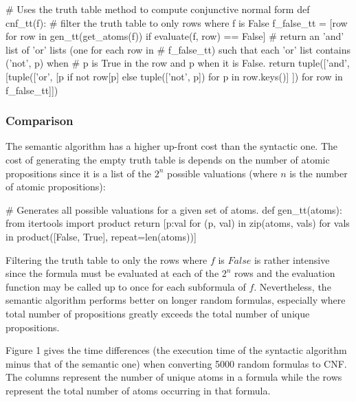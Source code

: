 \documentclass[a4paper,notitlepage]{scrartcl}
\begin{document}
\begin{code}
# Uses the truth table method to compute conjunctive normal form
def cnf_tt(f):
    # filter the truth table to only rows where f is False 
    f_false_tt = [row for row in gen_tt(get_atoms(f)) 
                  if evaluate(f, row) == False]
    # return an 'and' list of 'or' lists (one for each row in
    # f_false_tt) such that each 'or' list contains ('not', p) when
    # p is True in the row and p when it is False.
    return tuple(['and', [tuple(['or', 
        [p if not row[p] else tuple(['not', p]) for p in row.keys()] ]) 
        for row in f_false_tt]])
\end{code}

\subsubsection{Comparison}

The semantic algorithm has a higher up-front cost than the syntactic one.
The cost of generating the empty truth table is depends on the number of
   atomic propositions since 
it is a list of the $2^n$ possible valuations (where $n$ is the
        number of atomic propositions):
\begin{code}
# Generates all possible valuations for a given set of atoms.     
def gen_tt(atoms):
    from itertools import product
    return [{p:val for (p, val) in zip(atoms, vals)} for vals in 
         product([False, True], repeat=len(atoms))]
\end{code}
Filtering the truth table to only the rows where $f$ is $False$ is rather
        intensive since the formula must be evaluated at each of the
        $2^n$ rows and the evaluation function may be called up to once
        for each subformula of $f$.
Nevertheless, the semantic algorithm performs better on longer random formulas,
	especially 
        where total number of propositions greatly exceeds the total number of
        unique propositions. 

Figure 1 gives the time differences (the execution time of the
syntactic algorithm minus that of the semantic one) when converting 5000 random
formulas to CNF.
The columns represent the number of unique atoms in a formula while the rows
represent the total number of atoms occurring in that formula.
\end{document}
